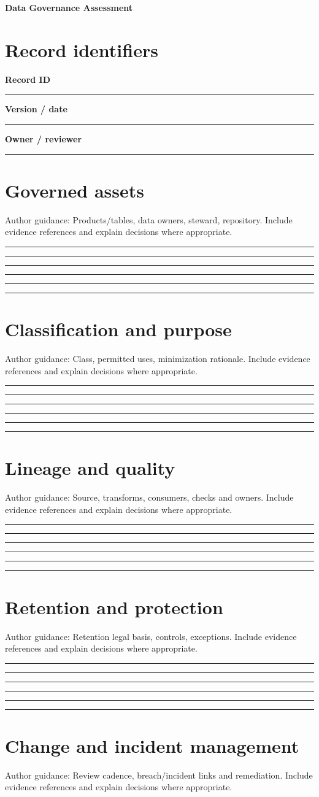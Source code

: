 \documentclass[11pt,letterpaper]{article}
\newcommand{\ResponseLine}{\par\vspace{1.05em}\noindent\rule{\linewidth}{0.4pt}\par}
\newcommand{\ResponseArea}{\ResponseLine\ResponseLine\ResponseLine}
\begin{document}
\begin{center}
{\LARGE\bfseries\color{navy} Data Governance Assessment}\par
\vspace{0.25em}{\large Authoring Template | guided fields}\par
{}
\end{center}
\vspace{0.8em}
\section{Record identifiers}
\textbf{Record ID}\ResponseLine\textbf{Version / date}\ResponseLine\textbf{Owner / reviewer}\ResponseLine
\section{Governed assets}
Author guidance: Products/tables, data owners, steward, repository. Include evidence references and explain decisions where appropriate.


\ResponseArea\ResponseArea
\section{Classification and purpose}
Author guidance: Class, permitted uses, minimization rationale. Include evidence references and explain decisions where appropriate.


\ResponseArea\ResponseArea
\section{Lineage and quality}
Author guidance: Source, transforms, consumers, checks and owners. Include evidence references and explain decisions where appropriate.


\ResponseArea\ResponseArea
\section{Retention and protection}
Author guidance: Retention legal basis, controls, exceptions. Include evidence references and explain decisions where appropriate.


\ResponseArea\ResponseArea
\section{Change and incident management}
Author guidance: Review cadence, breach/incident links and remediation. Include evidence references and explain decisions where appropriate.
\end{document}
